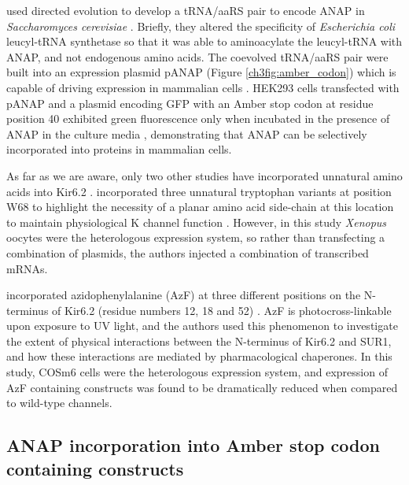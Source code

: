 \textcite{lee_genetic_2009} used directed evolution to develop a tRNA/aaRS pair to encode ANAP in \textit{Saccharomyces cerevisiae} \cite{lee_genetic_2009}.
Briefly, they altered the specificity of \textit{Escherichia coli} leucyl-tRNA synthetase so that it was able to aminoacylate the leucyl-tRNA with ANAP, and not endogenous amino acids.
The coevolved tRNA/aaRS pair were built into an expression plasmid pANAP (Figure \ref{ch3fig:amber_codon}) which is capable of driving expression in mammalian cells \cite{chatterjee_genetically_2013}.
HEK293 cells transfected with pANAP and a plasmid encoding GFP with an Amber stop codon at residue position 40 exhibited green fluorescence only when incubated in the presence of ANAP in the culture media \cite{chatterjee_genetically_2013}, demonstrating that ANAP can be selectively incorporated into proteins in mammalian cells.

As far as we are aware, only two other studies have incorporated unnatural amino acids into Kir6.2 \cite{zhang_conserved_2015, devaraneni_structurally_2015}.
\textcite{zhang_conserved_2015} incorporated three unnatural tryptophan variants at position W68 to highlight the necessity of a planar amino acid side-chain at this location to maintain physiological K\ATP{} channel function \cite{zhang_conserved_2015}.
However, in this study \textit{Xenopus} oocytes were the heterologous expression system, so rather than transfecting a combination of plasmids, the authors injected a combination of transcribed mRNAs.

\textcite{devaraneni_structurally_2015} incorporated azidophenylalanine (AzF) at three different positions on the N-terminus of Kir6.2 (residue numbers 12, 18 and 52) \cite{devaraneni_structurally_2015}.
AzF is photocross-linkable upon exposure to UV light, and the authors used this phenomenon to investigate the extent of physical interactions between the N-terminus of Kir6.2 and SUR1, and how these interactions are mediated by pharmacological chaperones.
In this study, COSm6 cells were the heterologous expression system, and expression of AzF containing constructs was found to be dramatically reduced when compared to wild-type channels.

\subsection{ANAP incorporation into Amber stop codon containing constructs}

